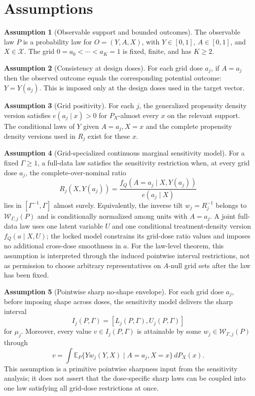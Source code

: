 \documentclass[11pt]{article}
\newcommand{\E}{\mathbb{E}}
\theoremstyle{definition}
\newtheorem{assumption}{Assumption}
\theoremstyle{plain}
\theoremstyle{remark}
\begin{document}
\section{Assumptions}
\begin{assumption}[Observable support and bounded outcomes]\label{ass:support}
The observable law \(P\) is a probability law for \(O=(Y,A,X)\), with \(Y\in[0,1]\), \(A\in[0,1]\), and \(X\in\mathcal X\).  The grid \(0=a_0<\cdots<a_K=1\) is fixed, finite, and has \(K\ge2\).
\end{assumption}

\begin{assumption}[Consistency at design doses]\label{ass:consistency}
For each grid dose \(a_j\), if \(A=a_j\) then the observed outcome equals the corresponding potential outcome: \(Y=Y(a_j)\).  This is imposed only at the design doses used in the target vector.
\end{assumption}

\begin{assumption}[Grid positivity]\label{ass:positivity}
For each \(j\), the generalized propensity density version satisfies \(e(a_j\mid x)>0\) for \(P_X\)-almost every \(x\) on the relevant support.  The conditional laws of \(Y\) given \(A=a_j,X=x\) and the complete propensity density versions used in \(R_j\) exist for these \(x\).
\end{assumption}

\begin{assumption}[Grid-specialized continuous marginal sensitivity model]\label{ass:cmsm}
For a fixed \(\Gamma\ge1\), a full-data law satisfies the sensitivity restriction when, at every grid dose \(a_j\), the complete-over-nominal ratio
\[
R_j(X,Y(a_j))
=
\frac{f_Q(A=a_j\mid X,Y(a_j))}{e(a_j\mid X)}
\]
lies in \([\Gamma^{-1},\Gamma]\) almost surely.  Equivalently, the inverse tilt \(w_j=R_j^{-1}\) belongs to \(\mathcal W_{\Gamma,j}(P)\) and is conditionally normalized among units with \(A=a_j\).  A joint full-data law uses one latent variable \(U\) and one conditional treatment-density version \(f_Q(a\mid X,U)\); the locked model constrains its grid-dose ratio values and imposes no additional cross-dose smoothness in \(a\).
For the law-level theorem, this assumption is interpreted through the induced pointwise interval restrictions, not as permission to choose arbitrary representatives on \(A\)-null grid sets after the law has been fixed.
\end{assumption}

\begin{assumption}[Pointwise sharp no-shape envelope]\label{ass:pointwise}
For each grid dose \(a_j\), before imposing shape across doses, the sensitivity model delivers the sharp interval
\[
  I_j(P,\Gamma)=[L_j(P,\Gamma),U_j(P,\Gamma)]
\]
for \(\mu_j\).  Moreover, every value \(v\in I_j(P,\Gamma)\) is attainable by some \(w_j\in\mathcal W_{\Gamma,j}(P)\) through
\[
  v=
  \int \E_P\{Yw_j(Y,X)\mid A=a_j,X=x\}\,dP_X(x).
\]
This assumption is a primitive pointwise sharpness input from the sensitivity analysis; it does not assert that the dose-specific sharp laws can be coupled into one law satisfying all grid-dose restrictions at once.
\end{assumption}
\end{document}
